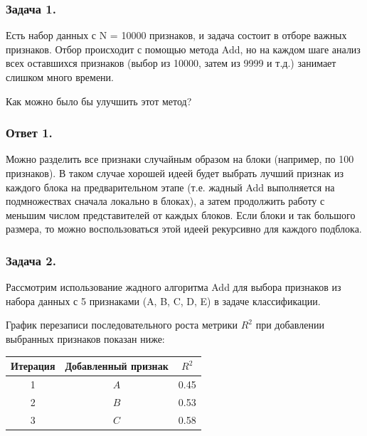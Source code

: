 \subsubsection{Задача 1.}

Есть набор данных с N = 10000 признаков, и задача состоит в отборе важных признаков. Отбор происходит с помощью метода Add, но на каждом шаге анализ всех оставшихся признаков (выбор из 10000, затем из 9999 и т.д.) занимает слишком много времени.

Как можно было бы улучшить этот метод?

\subsubsection{Ответ 1.}

Можно разделить все признаки случайным образом на блоки (например, по 100 признаков). В таком случае хорошей идеей будет выбрать лучший признак из каждого блока на предварительном этапе (т.е. жадный Add выполняется на подмножествах сначала локально в блоках), а затем продолжить работу с меньшим числом представителей от каждых блоков. Если блоки и так большого размера, то можно воспользоваться этой идеей рекурсивно для каждого подблока.

\subsubsection{Задача 2.}

Рассмотрим использование жадного алгоритма Add для выбора признаков из набора данных с 5 признаками ({A, B, C, D, E}) в задаче классификации.

График перезаписи последовательного роста метрики $R^2$ при добавлении выбранных признаков показан ниже:

\begin{table}[h!]
\centering
\begin{tabular}{|c|c|c|}
\hline
\textbf{Итерация} & \textbf{Добавленный признак} & \boldmath${R^2}$ \\ \hline
1                 & $A$                       & 0.45             \\ \hline
2                 & $B$                       & 0.53             \\ \hline
3                 & $C$                       & 0.58             \\ \hline
\end{tabular}
\end{table}

